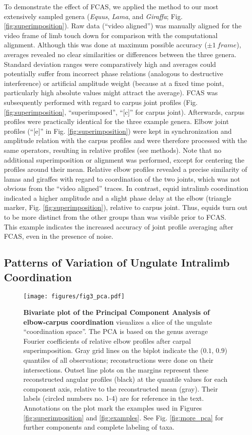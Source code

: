 To demonstrate the effect of FCAS, we applied the method to our most extensively sampled genera (\textit{Equus}, \textit{Lama}, and \textit{Giraffa}; Fig. \ref{fig:superimposition}).
Raw data (``video aligned'') was manually aligned for the video frame of limb touch down for comparison with the computational alignment.
Although this was done at maximum possible accuracy ($\pm 1\ frame$), averages revealed no clear similarities or differences between the three genera.
Standard deviation ranges were comparatively high and averages could potentially suffer from incorrect phase relations (analogous to destructive interference) or artificial amplitude weight (because at a fixed time point, particularly high absolute values might attract the average).
FCAS was subsequently performed with regard to carpus joint profiles (Fig. \ref{fig:superimposition}, ``superimposed'', ``[c]'' for carpus joint).
Afterwards, carpus profiles were practically identical for the three example genera.
Elbow joint profiles (``[e]'' in Fig. \ref{fig:superimposition}) were kept in synchronization and amplitude relation with the carpus profiles and were therefore processed with the same operators, resulting in relative profiles (see methods).
Note that no additional superimposition or alignment was performed, except for centering the profiles around their mean.
Relative elbow profiles revealed a precise similarity of lamas and giraffes with regard to coordination of the two joints, which was not obvious from the ``video aligned'' traces.
In contrast, equid intralimb coordination indicated a higher amplitude and a slight phase delay at the elbow (triangle marker, Fig. \ref{fig:superimposition}), relative to carpus joint.
Thus, equids turn out to be more distinct from the other groups than was visible prior to FCAS.
\\This example indicates the increased accuracy of joint profile averaging after FCAS, even in the presence of noise.

\subsection{Patterns of Variation of Ungulate Intralimb Coordination}

\begin{figure}[p]
\texttt{[image: figures/fig3\_pca.pdf]}
\caption{\textbf{Bivariate plot of the Principal Component Analysis of elbow-carpus coordination} visualizes a slice of the ungulate ``coordination space''.
The PCA is based on the genus average Fourier coefficients of relative elbow profiles after carpal superimposition.
Gray grid lines on the biplot indicate the ($0.1$, $0.9$) quantiles of all observations; reconstructions were done on their intersections.
Outset line plots on the margins represent these reconstructed angular profiles (black) at the quantile values for each component axis, relative to the reconstructed mean (gray).
Their labels (circled numbers no. 1-4) are for reference in the text.
Annotations on the plot mark the examples used in Figures \ref{fig:superimposition} and \ref*{fig:examples}.
See Fig. \ref*{fig:more_pca} for further components and complete labeling of taxa.
 }
\label{fig:pca}
\end{figure}


